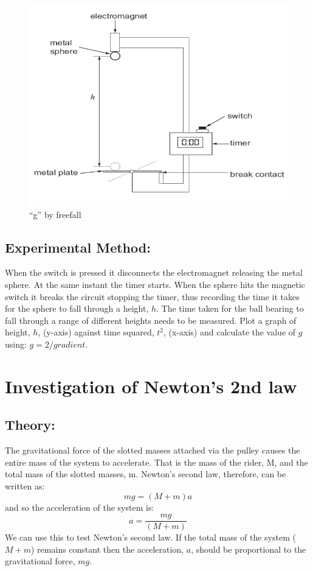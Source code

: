 \begin{figure}
\includegraphics[width=\textwidth]{gbyfree.PNG}
\caption{``g'' by freefall}
\end{figure}

\subsection{Experimental Method:}  
When the switch is pressed it disconnects the electromagnet releasing the metal sphere. At the same instant the timer starts. When the sphere hits the magnetic switch it breaks the circuit stopping the timer, thus recording the time it takes for the sphere to fall through a height, $h$. The time taken for the ball bearing to fall through a range of different heights needs to be measured. Plot a graph of height, $h$, (y-axis) against time squared, $t^{2}$, (x-axis) and calculate the value of $g$ using:  $g = 2/gradient$. 

\section{Investigation of Newton's 2nd law}

\subsection{Theory:}  
The gravitational force of the slotted masses attached via the pulley causes the entire mass of the system to accelerate. That is the mass of the rider, M, and the total mass of the slotted masses, m. Newton’s second law, therefore, can be written as:  
\[mg=(M+m)a\]
and so the acceleration of the system is:  
\[a=\frac{mg}{(M+m)}\]  
We can use this to test Newton's second law. If the total mass of the system ($M + m$) remains constant then the acceleration, $a$, should be proportional to the gravitational force, $mg$.  
